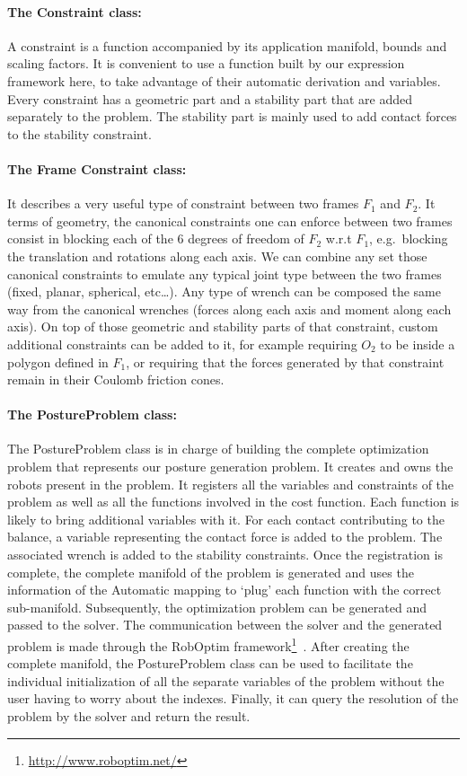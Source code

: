 \paragraph{The Constraint class:}
A constraint is a function accompanied by its application manifold, bounds and scaling factors.
It is convenient to use a function built by our expression framework here, to take advantage of their automatic derivation and variables.
Every constraint has a geometric part and a stability part that are added separately to the problem.
The stability part is mainly used to add contact forces to the stability constraint.

\paragraph{The Frame Constraint class:}
It describes a very useful type of constraint between two frames $F_1$ and $F_2$.
It terms of geometry, the canonical constraints one can enforce between two frames consist in blocking each of the 6 degrees of freedom of $F_2$ w.r.t $F_1$, e.g.\ blocking the translation and rotations along each axis.
We can combine any set those canonical constraints to emulate any typical joint type between the two frames (fixed, planar, spherical, etc\ldots).
Any type of wrench can be composed the same way from the canonical wrenches (forces along each axis and moment along each axis).
On top of those geometric and stability parts of that constraint, custom additional constraints can be added to it, for example requiring $O_2$ to be inside a polygon defined in $F_1$, or requiring that the forces generated by that constraint remain in their Coulomb friction cones.

\paragraph{The PostureProblem class:}
The PostureProblem class is in charge of building the complete optimization problem that represents our posture generation problem.
It creates and owns the robots present in the problem.
It registers all the variables and constraints of the problem as well as all the functions involved in the cost function.
Each function is likely to bring additional variables with it.
For each contact contributing to the balance, a variable representing the contact force is added to the problem.
The associated wrench is added to the stability constraints.
Once the registration is complete, the complete manifold of the problem is generated and uses the information of the Automatic mapping to `plug' each function with the correct sub-manifold.
Subsequently, the optimization problem can be generated and passed to the solver.
The communication between the solver and the generated problem is made through the RobOptim framework\footnote{\url{http://www.roboptim.net/}}~\cite{moulard:jsme:2013, moulard:jrsj:2014}.
After creating the complete manifold, the PostureProblem class can be used to facilitate the individual initialization of all the separate variables of the problem without the user having to worry about the indexes.
Finally, it can query the resolution of the problem by the solver and return the result.


